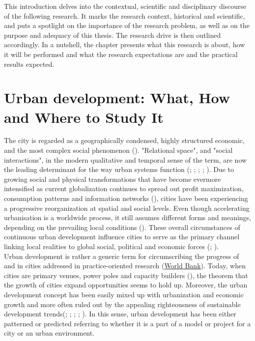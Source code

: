 \documentclass[11pt]{report}
\begin{document}
This introduction delves into the contextual, scientific and disciplinary discourse of the following research. It marks the research context, historical and scientific, and puts a spotlight on the importance of the research problem, as well as on the purpose and adequacy of this thesis. The research drive is then outlined accordingly. In a nutshell, the chapter presents what this research is about, how it will be performed and what the research expectations are and the practical results expected. 

\section{Urban development: What, How and Where to Study It}

The city is regarded as a geographically condensed, highly structured economic, and the most complex social phenomenon (\href{ref}{\citealt{mumford_city_1961}}). "Relational space", and "social interactions", in the modern qualitative and temporal sense of the term, are now the leading determinant for the way urban systems function (\citealt{soja_socio-spatial_1980}; \citealt{low_anthropology_2003}; \citealt{amin_regions_2004}; \citealt{massey_for_2005}; \href{ref}{\citealt{khan_epistemology_2013}}). 
Due to growing social and physical transformations that have become evermore intensified as current globalization continues to spread out profit maximization, consumption patterns and information networks (\href{Harvey}{\citealt{harvey_rebel_2012}}), cities have been experiencing a progressive reorganization at spatial and social levels. Even though accelerating urbanisation is a worldwide process, it still assumes different forms and meanings, depending on the prevailing local conditions (\href{Bolay}{\citealt{bolay_slums_2006}}). 
These overall circumstances of continuous urban development influence cities to serve as the primary channel linking local realities to global social, political and economic forces (\href{yates}{\citealt{yates_north_2002}}; \href{tsenkova}{\citealt{tsenkova_beyond_2006}}).
\\

Urban development is rather a generic term for circumscribing the progress of and in cities addressed in  practice-oriented research (\href{ref}{World Bank}). Today, when cities are primary venues, power poles and capacity builders (\href{ref}{\citealt{castells_urban_1979}}), the theorem that the growth of cities expand opportunities seems to hold up. Moreover, the urban development concept has been easily mixed up with urbanization and economic growth and more often ruled out by the appealing righteousness of sustainable development trends(\citealt{christie_here_2001}; \citealt{hopwood_sustainable_2005}; \citealt{sachs_development_2010}; \citealt{sachs_millennium_2012}; \citealt{sachs_age_2015}).
In this sense, urban development has been either patterned or predicted referring to whether it is a part of a model or project for a city or an urban environment.
\\
\end{document}
